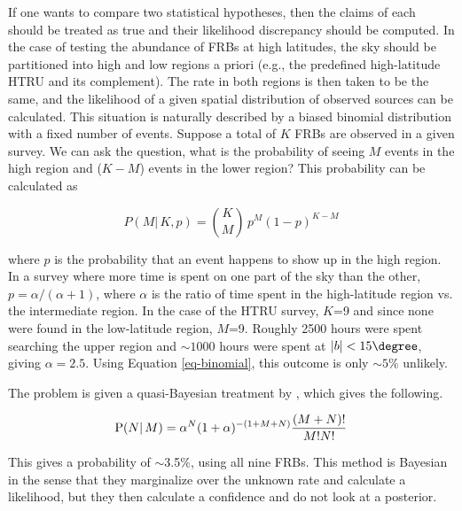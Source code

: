 \documentclass[useAMS,usenatbib]{mn2e}
\begin{document}
If one wants to 
compare two statistical hypotheses, then the claims of each should 
be treated as true and their likelihood discrepancy should be computed.
In the case of testing the abundance of FRBs at high latitudes,
the sky should be partitioned into high and low regions a priori 
(e.g., the predefined high-latitude HTRU and its complement). The rate in both regions 
is then taken to be the same, and the likelihood of a given spatial distribution of observed
sources can be calculated. This situation is naturally
described by a biased binomial distribution with a fixed number of events. Suppose
a total of $K$ FRBs are observed in a given survey. We can ask the question, what is the probability of 
seeing $M$ events in the high region and ($K-M$) events in the lower region?
This probability can be calculated %
as 

\begin{equation}
\label{eq-binomial}
P(M | \, {K}, p) =  \binom{K}{M} \, p^{M} (1-p)^{K-M} 
\end{equation}

\noindent where $p$ is the probability that an event happens to show up in the 
high region. In a survey where more time is spent on one part of the 
sky than the other, $p=\alpha/(\alpha+1)$, where $\alpha$ is the ratio of 
time spent in the high-latitude region vs. the intermediate region. In the case of the HTRU 
survey, $K$=9 and since none were found 
in the low-latitude region, $M$=9. Roughly 2500 hours were spent searching the upper region
and $\sim1000$ hours were spent at $|b| < 15\degree$, giving $\alpha=2.5$. Using Equation 
\ref{eq-binomial}, this outcome is only $\sim5\%$ unlikely. 

The problem is given a quasi-Bayesian treatment by
\cite{2014ApJ...789L..26P}, which gives the following.

\begin{equation}
\label{eq-petroff}
\textup{P}(N | \,M) =  \alpha^{N} (1 + \alpha)^{-(1+M+N)} \frac{(M+N)!}{M!N!}
\end{equation}

\noindent This gives a probability of $\sim$3.5$\%$, using all nine FRBs. This method 
is Bayesian in the sense that they marginalize over the unknown rate 
and calculate a likelihood, but they then calculate a confidence 
and do not look at a posterior.  

\end{document}
